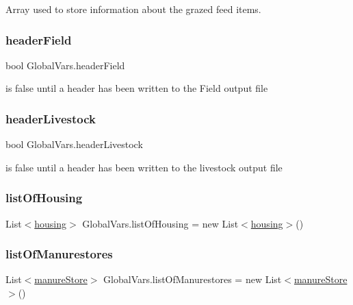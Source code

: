 Array used to store information about the grazed feed items. 

\mbox{\label{class_global_vars_a2e743041f1f7c995cc92ce90dced2822}} 
\subsubsection{\texorpdfstring{headerField}{headerField}}
{\footnotesize\ttfamily bool Global\+Vars.\+header\+Field}



is false until a header has been written to the Field output file 

\mbox{\label{class_global_vars_a13f0621b9ef546909f40ca12eb999c78}} 
\subsubsection{\texorpdfstring{headerLivestock}{headerLivestock}}
{\footnotesize\ttfamily bool Global\+Vars.\+header\+Livestock}



is false until a header has been written to the livestock output file 

\mbox{\label{class_global_vars_aeba83240bfe09b5b7c59185674f232b6}} 
\subsubsection{\texorpdfstring{listOfHousing}{listOfHousing}}
{\footnotesize\ttfamily List$<$\mbox{\hyperlink{classhousing}{housing}}$>$ Global\+Vars.\+list\+Of\+Housing = new List$<$\mbox{\hyperlink{classhousing}{housing}}$>$()}

\mbox{\label{class_global_vars_a87f4d7b7be35a15d8f7a7b02eff17435}} 
\subsubsection{\texorpdfstring{listOfManurestores}{listOfManurestores}}
{\footnotesize\ttfamily List$<$\mbox{\hyperlink{classmanure_store}{manure\+Store}}$>$ Global\+Vars.\+list\+Of\+Manurestores = new List$<$\mbox{\hyperlink{classmanure_store}{manure\+Store}}$>$()}

